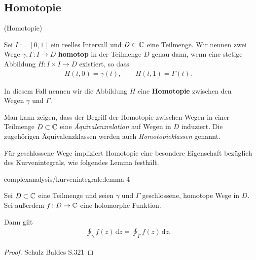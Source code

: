 \subsection{Homotopie}
\begin{definition}{(Homotopie)}{}\label{complexanalysis/kurvenintegrale:definition-3}



\par
Sei \(I := [0,1]\) ein reelles Intervall und \(D \subset \mathbb{C}\) eine Teilmenge.
Wir nennen zwei Wege \(\gamma, \Gamma \colon I \rightarrow D\) \textbf{homotop} in der Teilmenge \(D\) genau dann, wenn eine stetige Abbildung \(H \colon I \times I \rightarrow D\) existiert, so dass
\begin{align*}
H(t,0) = \gamma(t), \qquad H(t,1) = \Gamma(t).
\end{align*}
\par
In diesem Fall nennen wir die Abbildung \(H\) eine \textbf{Homotopie} zwischen den Wegen \(\gamma\) und \(\Gamma\).
\end{definition}

\par
Man kann zeigen, dass der Begriff der Homotopie zwischen Wegen in einer Teilmenge \(D \subset \mathbb{C}\) eine \emph{Äquivalenzrelation} auf Wegen in \(D\) induziert.
Die zugehörigen Äquivalenzklassen werden auch \emph{Homotopieklassen} genannt.

\par
Für geschlossene Wege impliziert Homotopie eine besondere Eigenschaft bezüglich des Kurvenintegrals, wie folgendes Lemma festhält.
\begin{lemma}{}{complexanalysis/kurvenintegrale:lemma-4}



\par
Sei \(D \subset \mathbb{C}\) eine Teilmenge und seien \(\gamma\) und \(\Gamma\) geschlossene, homotope Wege in \(D\).
Sei außerdem \(f \colon D \rightarrow \mathbb{C}\) eine holomorphe Funktion.

\par
Dann gilt
\begin{align*}
\oint_\gamma f(z) \, \mathrm{d}z = \oint_\Gamma f(z) \, \mathrm{d}z.
\end{align*}\end{lemma}

\begin{proof}
 Schulz Baldes S.321
\end{proof}


